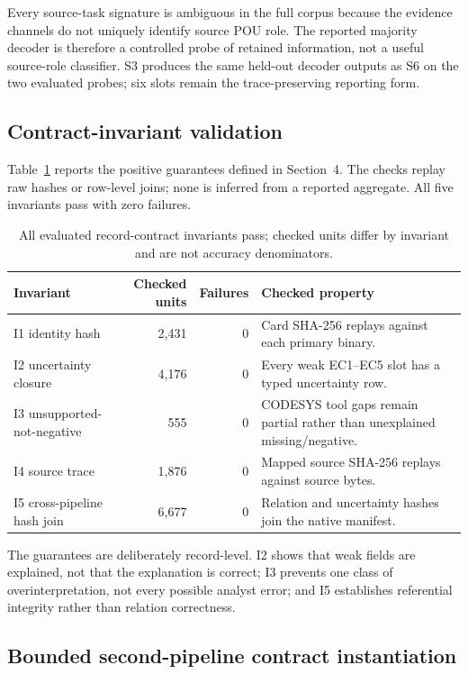 \documentclass[manuscript,screen,review]{acmart}
\begin{document}
Every source-task signature is ambiguous in the full corpus because the evidence channels do not uniquely identify source POU role. The reported majority decoder is therefore a controlled probe of retained information, not a useful source-role classifier. S3 produces the same held-out decoder outputs as S6 on the two evaluated probes; six slots remain the trace-preserving reporting form.

\subsection{Contract-invariant validation}

Table~\ref{tab:invariants} reports the positive guarantees defined in Section~4. The checks replay raw hashes or row-level joins; none is inferred from a reported aggregate. All five invariants pass with zero failures.

\begin{table}[t]
\centering
\small
\caption{All evaluated record-contract invariants pass; checked units differ by invariant and are not accuracy denominators.}
\label{tab:invariants}
\begin{tabularx}{\textwidth}{>{\raggedright\arraybackslash}p{}r r>{\raggedright\arraybackslash}X}
\toprule
Invariant & Checked units & Failures & Checked property \\
\midrule
I1 identity hash & 2,431 & 0 & Card SHA-256 replays against each primary binary. \\
I2 uncertainty closure & 4,176 & 0 & Every weak EC1--EC5 slot has a typed uncertainty row. \\
I3 unsupported-not-negative & 555 & 0 & CODESYS tool gaps remain partial rather than unexplained missing/negative. \\
I4 source trace & 1,876 & 0 & Mapped source SHA-256 replays against source bytes. \\
I5 cross-pipeline hash join & 6,677 & 0 & Relation and uncertainty hashes join the native manifest. \\
\bottomrule
\end{tabularx}
\end{table}

The guarantees are deliberately record-level. I2 shows that weak fields are explained, not that the explanation is correct; I3 prevents one class of overinterpretation, not every possible analyst error; and I5 establishes referential integrity rather than relation correctness.

\subsection{Bounded second-pipeline contract instantiation}
\end{document}
